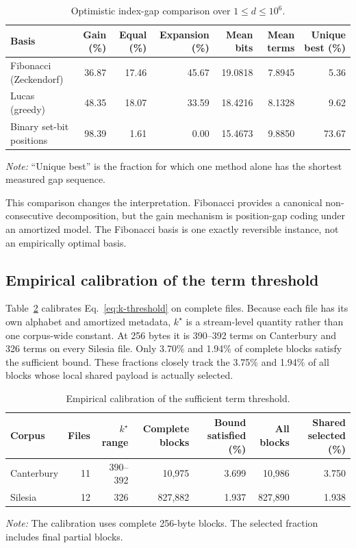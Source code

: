 \documentclass[a4paper,fleqn]{cas-dc}
\newcommand{\tablenote}[1]{%
  \par\smallskip
  \begin{minipage}{0.98\linewidth}
  \footnotesize\textit{Note:} #1
  \end{minipage}}
\begin{document}
\begin{table}[t]
\caption{Optimistic index-gap comparison over $1\leq d\leq10^6$.}
\label{tab:numeration}
\centering
\begin{tabular}{lrrrrrr}
\toprule
Basis & Gain (\%) & Equal (\%) & Expansion (\%) & Mean bits & Mean terms & Unique best (\%)\\
\midrule
Fibonacci (Zeckendorf) & 36.87 & 17.46 & 45.67 & 19.0818 & 7.8945 & 5.36\\
Lucas (greedy) & 48.35 & 18.07 & 33.59 & 18.4216 & 8.1328 & 9.62\\
Binary set-bit positions & 98.39 & 1.61 & 0.00 & 15.4673 & 9.8850 & 73.67\\
\bottomrule
\end{tabular}
\tablenote{``Unique best'' is the fraction for which one method alone has the
shortest measured gap sequence.}
\end{table}

This comparison changes the interpretation. Fibonacci provides a canonical
non-consecutive decomposition, but the gain mechanism is position-gap coding
under an amortized model. The Fibonacci basis is one exactly reversible
instance, not an empirically optimal basis.

\subsection{Empirical calibration of the term threshold}

Table~\ref{tab:kstar} calibrates Eq.~\eqref{eq:k-threshold} on complete files.
Because each file has its own alphabet and amortized metadata, $k^\star$ is a
stream-level quantity rather than one corpus-wide constant. At 256 bytes it is
390--392 terms on Canterbury and 326 terms on every Silesia file. Only 3.70\%
and 1.94\% of complete blocks satisfy the sufficient bound. These fractions
closely track the 3.75\% and 1.94\% of all blocks whose local shared payload is
actually selected.

\begin{table}[t]
\caption{Empirical calibration of the sufficient term threshold.}
\label{tab:kstar}
\centering
\begin{tabular}{lrrrrrr}
\toprule
Corpus & Files & $k^\star$ range & Complete blocks & Bound satisfied (\%) &
All blocks & Shared selected (\%)\\
\midrule
Canterbury & 11 & 390--392 & 10,975 & 3.699 & 10,986 & 3.750\\
Silesia & 12 & 326 & 827,882 & 1.937 & 827,890 & 1.938\\
\bottomrule
\end{tabular}
\tablenote{The calibration uses complete 256-byte blocks. The selected
fraction includes final partial blocks.}
\end{table}
\end{document}
